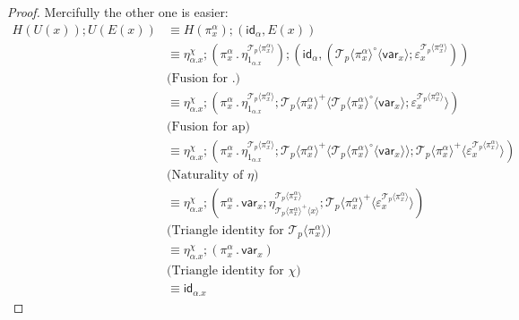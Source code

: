 \documentclass[10pt]{article}
\theoremstyle{definition}
\newcommand\TrCirc[2]{\ensuremath{{#1}^\circ(#2)}}
\newcommand\var[1]{\ensuremath{\mathsf{var}_{#1}}}
\newcommand{\id}{\mathsf{id}}
\newcommand\ApEl[2]{\mathcal{T}_{#1}\langle#2\rangle}
\newcommand\ap[2]{\ensuremath{#1 \langle #2 \rangle }}
\newcommand\bdot[0]{\mathbin{.}}
\begin{document}
\begin{proof}
Mercifully the other one is easier:
\begin{align*}
H(U(x)); U(E(x))
&\equiv H(\pi^\alpha_x) ; (\id_\alpha, E(x)) \\
&\equiv \eta^\chi_{\alpha.x} ; (\pi^\alpha_x \bdot \eta^{\ApEl{p}{\pi^\alpha_x}}_{1_{\alpha.x}}) ; (\id_\alpha, (\ap{\ApEl{p}{\pi^\alpha_x}^\circ}{\var{x}} ; \varepsilon^{\ApEl{p}{\pi^\alpha_x}}_x)) \\
& \text{(Fusion for $\bdot$)} \\
&\equiv \eta^\chi_{\alpha.x} ; (\pi^\alpha_x \bdot \eta^{\ApEl{p}{\pi^\alpha_x}}_{1_{\alpha.x}} ; \ap{\ApEl{p}{\pi^\alpha_x}^+}{\ap{\ApEl{p}{\pi^\alpha_x}^\circ}{\var{x}} ; \varepsilon^{\ApEl{p}{\pi^\alpha_x}}_x}) \\
& \text{(Fusion for ap)} \\
&\equiv \eta^\chi_{\alpha.x} ; (\pi^\alpha_x \bdot \eta^{\ApEl{p}{\pi^\alpha_x}}_{1_{\alpha.x}} ; \ap{\ApEl{p}{\pi^\alpha_x}^+}{\ap{\ApEl{p}{\pi^\alpha_x}^\circ}{\var{x}}} ; \ap{\ApEl{p}{\pi^\alpha_x}^+}{\varepsilon^{\ApEl{p}{\pi^\alpha_x}}_x}) \\
& \text{(Naturality of $\eta$)} \\
&\equiv \eta^\chi_{\alpha.x} ; (\pi^\alpha_x \bdot \var{x} ; \eta^{\ApEl{p}{\pi^\alpha_x}}_{\ap{\ApEl{p}{\pi^\alpha_x}^+}{x}} ; \ap{\ApEl{p}{\pi^\alpha_x}^+}{\varepsilon^{\ApEl{p}{\pi^\alpha_x}}_x}) \\
&\text{(Triangle identity for $\ApEl{p}{\pi^\alpha_x}$)} \\
&\equiv \eta^\chi_{\alpha.x} ; (\pi^\alpha_x \bdot \var{x}) \\
&\text{(Triangle identity for $\chi$)} \\
&\equiv \id_{\alpha.x}
\end{align*}
\end{proof}
\end{document}
